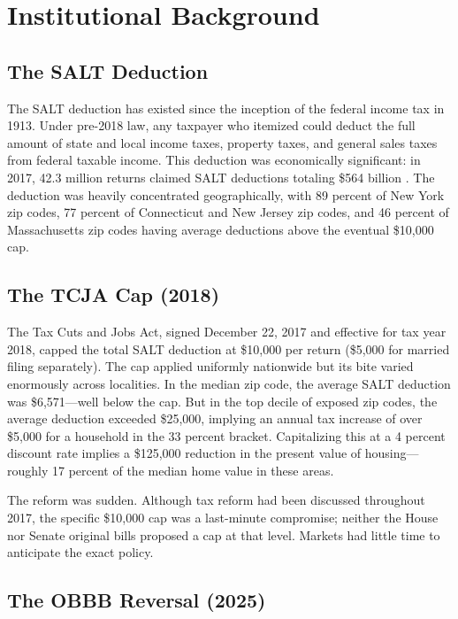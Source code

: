 \documentclass[12pt]{article}
\begin{document}
\section{Institutional Background}

\subsection{The SALT Deduction}

The SALT deduction has existed since the inception of the federal income tax in 1913. Under pre-2018 law, any taxpayer who itemized could deduct the full amount of state and local income taxes, property taxes, and general sales taxes from federal taxable income. This deduction was economically significant: in 2017, 42.3 million returns claimed SALT deductions totaling \$564 billion \citep{irs2019soi}. The deduction was heavily concentrated geographically, with 89 percent of New York zip codes, 77 percent of Connecticut and New Jersey zip codes, and 46 percent of Massachusetts zip codes having average deductions above the eventual \$10,000 cap.

\subsection{The TCJA Cap (2018)}

The Tax Cuts and Jobs Act, signed December 22, 2017 and effective for tax year 2018, capped the total SALT deduction at \$10,000 per return (\$5,000 for married filing separately). The cap applied uniformly nationwide but its bite varied enormously across localities. In the median zip code, the average SALT deduction was \$6,571---well below the cap. But in the top decile of exposed zip codes, the average deduction exceeded \$25,000, implying an annual tax increase of over \$5,000 for a household in the 33 percent bracket. Capitalizing this at a 4 percent discount rate implies a \$125,000 reduction in the present value of housing---roughly 17 percent of the median home value in these areas.

The reform was sudden. Although tax reform had been discussed throughout 2017, the specific \$10,000 cap was a last-minute compromise; neither the House nor Senate original bills proposed a cap at that level. Markets had little time to anticipate the exact policy.

\subsection{The OBBB Reversal (2025)}
\end{document}
